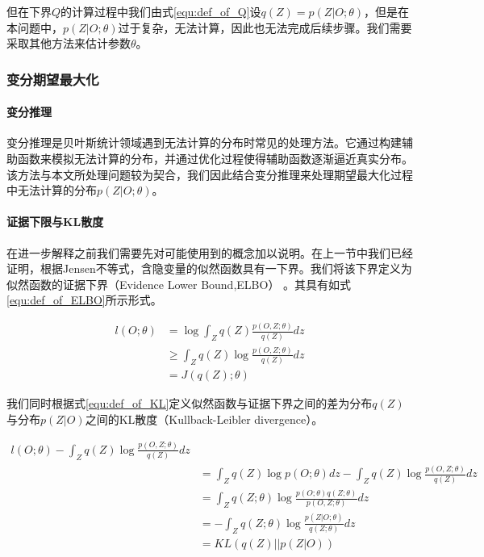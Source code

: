 但在下界$Q$的计算过程中我们由式\ref{equ:def_of_Q}设$q(Z)=p(Z|O;\theta)$，但是在本问题中，$p(Z|O;\theta)$过于复杂，无法计算，因此也无法完成后续步骤。我们需要采取其他方法来估计参数$\theta$。

\subsubsection{变分期望最大化}
\paragraph{变分推理}

变分推理是贝叶斯统计领域遇到无法计算的分布时常见的处理方法\cite{jordan_introduction_1999}。它通过构建辅助函数来模拟无法计算的分布，并通过优化过程使得辅助函数逐渐逼近真实分布\cite{jaakkola_bayesian_2000}。该方法与本文所处理问题较为契合，我们因此结合变分推理来处理期望最大化过程中无法计算的分布$p(Z|O;\theta)$。

\paragraph{证据下限与KL散度}

在进一步解释之前我们需要先对可能使用到的概念加以说明。在上一节中我们已经证明，根据Jensen不等式，含隐变量的似然函数具有一下界。我们将该下界定义为似然函数的证据下界（Evidence Lower Bound,ELBO）\cite{tzikas_variational_2008} 。其具有如式\ref{equ:def_of_ELBO}所示形式。

\begin{equation}\label{equ:def_of_ELBO}
  \begin{aligned}
l(O;\theta)
&=\log \int_Z q(Z)\frac{p(O,Z;\theta)}{q(Z)}dz\\
&\geq \int_Z q(Z) \log \frac{p(O,Z;\theta)}{q(Z)}dz\\
&=J(q(Z);\theta)
\end{aligned}\end{equation}

我们同时根据式\ref{equ:def_of_KL}定义似然函数与证据下界之间的差为分布$q(Z)$与分布$p(Z|O)$之间的KL散度（Kullback-Leibler divergence）\cite{neal_view_1998}。

\begin{equation}\label{equ:def_of_KL}
  \begin{aligned}
l(O;\theta) - \int_Z q(Z) \log \frac{p(O,Z;\theta)}{q(Z)}dz \\
&= \int_Zq(Z)\log p(O;\theta)dz- \int_Z q(Z) \log \frac{p(O,Z;\theta)}{q(Z)}dz\\
&=\int_Zq(Z;\theta)\log \frac{p(O;\theta)q(Z;\theta)}{p(O,Z;\theta)}dz\\
&=-\int_Zq(Z;\theta)\log \frac{p(Z|O;\theta)}{q(Z;\theta)}dz\\
&=KL(q(Z)||p(Z|O))
\end{aligned}\end{equation}

